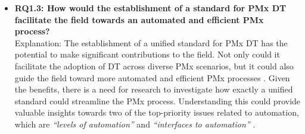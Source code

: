 \documentclass[runningheads]{llncs}
\begin{document}
\begin{itemize}
\item \textbf{RQ1.3: How would the establishment of a standard for PMx DT facilitate the field towards an automated and efficient PMx process?} \\
Explanation: The establishment of a unified standard for PMx DT has the potential to make significant contributions to the field. Not only could it facilitate the adoption of DT across diverse PMx scenarios, but it could also guide the field toward more automated and efficient PMx processes \cite{kunzer2022digital,katherine2022digital}. Given the benefits, there is a need for research to investigate how exactly a unified standard could streamline the PMx process. Understanding this could provide valuable insights towards two of the top-priority issues related to automation, which are \textit{``levels of automation”} and \textit{``interfaces to automation”} \cite{ohara2010human}.

\end{itemize}
\end{document}
